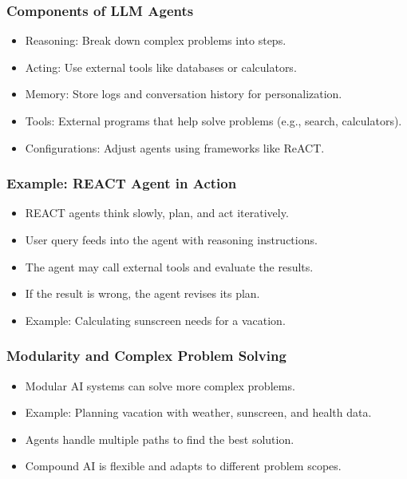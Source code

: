 \begin{frame}[fragile]\frametitle{Components of LLM Agents}
    \begin{itemize}
        \item Reasoning: Break down complex problems into steps.
        \item Acting: Use external tools like databases or calculators.
        \item Memory: Store logs and conversation history for personalization.
        \item Tools: External programs that help solve problems (e.g., search, calculators).
        \item Configurations: Adjust agents using frameworks like ReACT.
    \end{itemize}
\end{frame}

\begin{frame}[fragile]\frametitle{Example: REACT Agent in Action}
    \begin{itemize}
        \item REACT agents think slowly, plan, and act iteratively.
        \item User query feeds into the agent with reasoning instructions.
        \item The agent may call external tools and evaluate the results.
        \item If the result is wrong, the agent revises its plan.
        \item Example: Calculating sunscreen needs for a vacation.
    \end{itemize}
\end{frame}

\begin{frame}[fragile]\frametitle{Modularity and Complex Problem Solving}
    \begin{itemize}
        \item Modular AI systems can solve more complex problems.
        \item Example: Planning vacation with weather, sunscreen, and health data.
        \item Agents handle multiple paths to find the best solution.
        \item Compound AI is flexible and adapts to different problem scopes.
    \end{itemize}
\end{frame}

